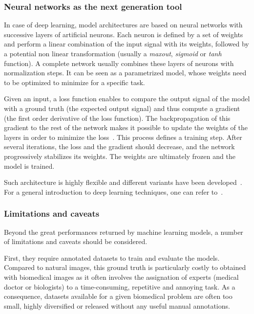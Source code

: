 \subsubsection{Neural networks as the next generation tool}

In case of deep learning, model architectures are based on neural networks with successive layers of artificial neurons.
Each neuron is defined by a set of weights and perform a linear combination of the input signal with its weights, followed by a potential non linear transformation (usually a \emph{maxout}, \emph{sigmoid} or \emph{tanh} function).
A complete network usually combines these layers of neurons with normalization steps.
It can be seen as a parametrized model, whose weights need to be optimized to minimize for a specific task.

Given an input, a loss function enables to compare the output signal of the model with a ground truth (the expected output signal) and thus compute a gradient (the first order derivative of the loss function).
The backpropagation of this gradient to the rest of the network makes it possible to update the weights of the layers in order to minimize the loss~\cite{rumelhart_learning_1986}.
This process defines a training step.
After several iterations, the loss and the gradient should decrease, and the network progressively stabilizes its weights.
The weights are ultimately frozen and the model is trained.

Such architecture is highly flexible and different variants have been developed~\cite{lecun_deep_2015}.
For a general introduction to deep learning techniques, one can refer to~\cite{Goodfellow_2016}.

\subsubsection{Limitations and caveats}

Beyond the great performances returned by machine learning models, a number of limitations and caveats should be considered.

First, they require annotated datasets to train and evaluate the models.
Compared to natural images, this ground truth is particularly costly to obtained with biomedical images as it often involves the assignation of experts (medical doctor or biologists) to a time-consuming, repetitive and annoying task.
As a consequence, datasets available for a given biomedical problem are often too small, highly diversified or released without any useful manual annotations.

